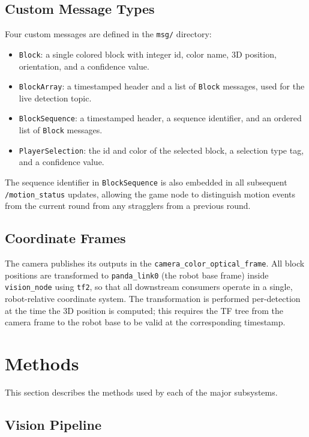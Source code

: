 \documentclass[conference]{IEEEtran}
\begin{document}
\subsection{Custom Message Types}

Four custom messages are defined in the \texttt{msg/} directory:

\begin{itemize}
\item \texttt{Block}: a single colored block with integer id, color
name, 3D position, orientation, and a confidence value.
\item \texttt{BlockArray}: a timestamped header and a list of
\texttt{Block} messages, used for the live detection topic.
\item \texttt{BlockSequence}: a timestamped header, a sequence
identifier, and an ordered list of \texttt{Block} messages.
\item \texttt{PlayerSelection}: the id and color of the selected block,
a selection type tag, and a confidence value.
\end{itemize}

The sequence identifier in \texttt{BlockSequence} is also embedded in
all subsequent \texttt{/motion\_status} updates, allowing the game node
to distinguish motion events from the current round from any stragglers
from a previous round.

\subsection{Coordinate Frames}

The camera publishes its outputs in the \texttt{camera\_color\_optical\_frame}.
All block positions are transformed to \texttt{panda\_link0} (the robot
base frame) inside \texttt{vision\_node} using \texttt{tf2}, so that
all downstream consumers operate in a single, robot-relative coordinate
system. The transformation is performed per-detection at the time the
3D position is computed; this requires the TF tree from the camera
frame to the robot base to be valid at the corresponding timestamp.

\section{Methods}
\label{sec:methods}

This section describes the methods used by each of the major subsystems.

\subsection{Vision Pipeline}
\label{sec:vision}
\end{document}
